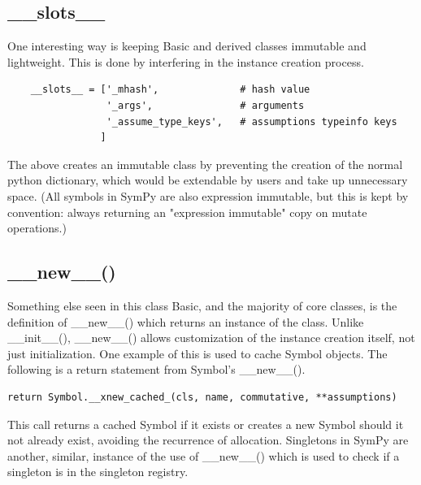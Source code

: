 \documentclass[11pt,a4paper,oneside]{report}
\begin{document}
\subsection*{\_\_slots\_\_}
 One interesting way is keeping Basic and derived classes immutable and lightweight. This is done by interfering in the instance creation process.
\begin{verbatim}
    __slots__ = ['_mhash',              # hash value
                 '_args',               # arguments
                 '_assume_type_keys',   # assumptions typeinfo keys
                ]
\end{verbatim}
The above creates an immutable class by preventing the creation of the normal python dictionary, which would be extendable by users and take up unnecessary space. (All symbols in SymPy are also expression immutable, but this is kept by convention: always returning an "expression immutable" copy on mutate operations.)
\subsection*{\_\_new\_\_()}
Something else seen in this class Basic, and the majority of core classes, is the definition of \_\_new\_\_() which returns an instance of the class. Unlike \_\_init\_\_(), \_\_new\_\_() allows customization of the instance creation itself, not just initialization. One example of this is used to cache Symbol objects. The following is a return statement from Symbol's \_\_new\_\_().
\begin{verbatim}
return Symbol.__xnew_cached_(cls, name, commutative, **assumptions)
\end{verbatim}
This call returns a cached Symbol if it exists or creates a new Symbol should it not already exist, avoiding the recurrence of allocation. Singletons in SymPy are another, similar, instance of the use of \_\_new\_\_() which is used to check if a singleton is in the singleton registry.
\end{document}
